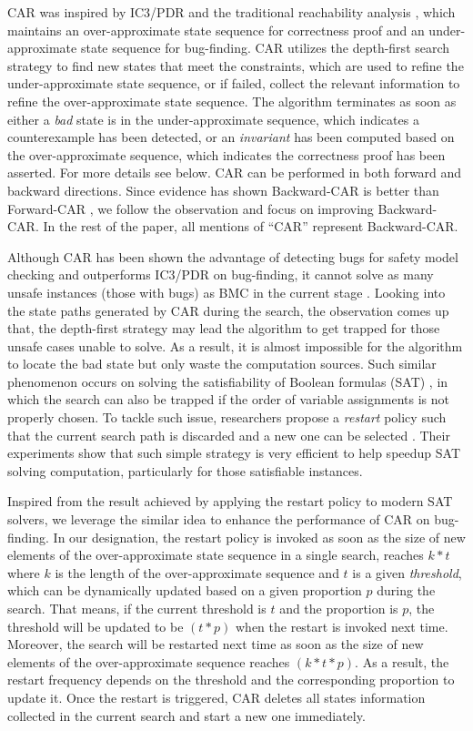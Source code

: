 CAR was inspired by IC3/PDR and the traditional reachability analysis \cite{}, which maintains an over-approximate state sequence for correctness proof and an under-approximate state sequence for bug-finding. CAR utilizes the depth-first search strategy to find new states that meet the constraints, which are used to refine the under-approximate state sequence, or if failed, collect the relevant  information to refine the over-approximate state sequence. The algorithm terminates as soon as either a \emph{bad} state is in the under-approximate sequence, which indicates a counterexample has been detected, or an \emph{invariant} has been computed based on the over-approximate sequence, which indicates the correctness proof has been asserted.  For more details see below. CAR can be performed in both forward and backward directions. Since evidence has shown Backward-CAR is better than Forward-CAR \cite{}, we follow the observation and focus on improving Backward-CAR. In the rest of the paper, all mentions of ``CAR'' represent Backward-CAR. 

Although CAR has been shown the advantage of detecting bugs for safety model checking and outperforms IC3/PDR on bug-finding, it cannot solve as many unsafe instances (those with bugs) as BMC in the current stage \cite{}. Looking into the state paths generated by CAR during the search, the observation comes up that, the depth-first strategy may lead the algorithm to get trapped for those unsafe cases unable to solve. As a result, it is almost impossible for the algorithm to locate the bad state but only waste the computation sources. Such similar phenomenon occurs on solving the satisfiability of Boolean formulas (SAT) \cite{}, in which the search can also be trapped if the order of variable assignments is not properly chosen. To tackle such issue, researchers propose a \emph{restart} policy such that the current search path is discarded and a new one can be selected \cite{}. Their experiments show that such simple strategy is very efficient to help speedup  SAT solving computation, particularly for those satisfiable instances. 

Inspired from the result achieved by applying the restart policy to modern SAT solvers, we leverage the similar idea to enhance the performance of CAR on bug-finding. In our designation, the restart policy is invoked as soon as the size of new elements of the over-approximate state sequence in a single search, reaches $k*t$ where $k$ is the length of the over-approximate sequence and $t$ is a given  \emph{threshold}, which can be dynamically updated based on a given proportion $p$ during the search. That means, if the current threshold is $t$ and the proportion is $p$, the threshold will be updated to be $(t*p)$ when the restart is invoked next time. Moreover, the search will be restarted next time as soon as the size of new elements of the over-approximate sequence reaches $(k*t*p)$. As a result, the restart frequency depends on the threshold and the corresponding proportion to update it. Once the restart is triggered, CAR deletes all states information collected in the current search and start a new one immediately. 

